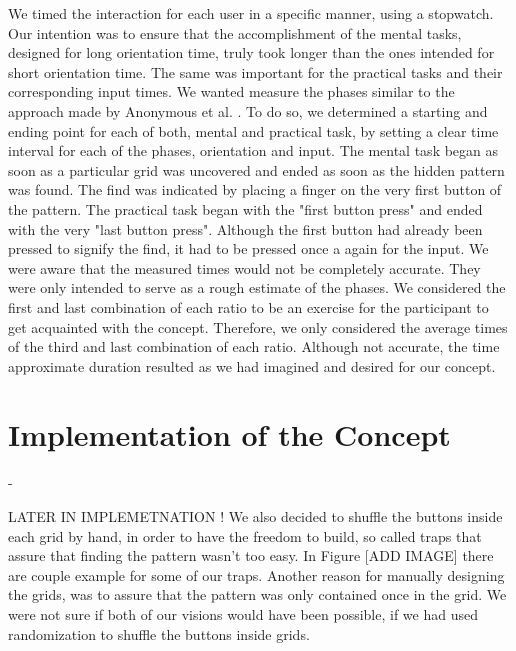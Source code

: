 We timed the interaction for each user in a specific manner, using a stopwatch. Our intention was to ensure that the accomplishment of the mental tasks, designed for long orientation time, truly took longer than the ones intended for short orientation time. The same was important for the practical tasks and their corresponding input times. We wanted measure the phases similar to the approach made by Anonymous et al. \cite{anonymous}. To do so, we determined a starting and ending point for each of both, mental and practical task, by setting a clear time interval for each of the phases, orientation and input. The mental task began as soon as a particular grid was uncovered and ended as soon as the hidden pattern was found. The find was indicated by placing a finger on the very first button of the pattern. The practical task began with the "first button press" and ended with the very "last button press". Although the first button had already been pressed to signify the find, it had to be pressed once a again for the input. We were aware that the measured times would not be completely accurate. They were only intended to serve as a rough estimate of the phases. We considered the first and last combination of each ratio to be an exercise for the participant to get acquainted with the concept. Therefore, we only considered the average times of the third and last combination of each ratio. Although not accurate, the time approximate duration resulted as we had imagined and desired for our concept.

\section{Implementation of the Concept} \label{4.2.2.5}

- 

LATER IN IMPLEMETNATION ! 
We also decided to shuffle the buttons inside each grid by hand, in order to have the freedom to build, so called traps that assure that finding the pattern wasn't too easy. In Figure [ADD IMAGE] there are couple example for some of our traps. Another reason for manually designing the grids, was to assure that the pattern was only contained once in the grid. We were not sure if both of our visions would have been possible, if we had used randomization to shuffle the buttons inside grids. \\

